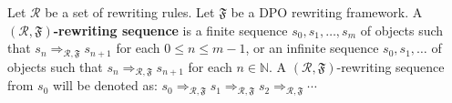 \begin{definition}
    Let \(\mathcal{R}\) be a set of rewriting rules. Let $\mathfrak{F}$ be a DPO rewriting framework.
    A \textbf{$(\mathcal{R},\mathfrak{F})$-rewriting sequence} is a finite sequence \(s_0,s_1,\hdots, s_m\) of objects such that \(s_n \Rightarrow_{\mathcal{R},\mathfrak{F}} s_{n+1}\) for each \( 0 \leq n \leq m-1\), or an infinite sequence \(s_0,s_1,\hdots\) of objects such that \(s_n \Rightarrow_{\mathcal{R},\mathfrak{F}} s_{n+1}\) for each \(n \in \mathbb{N}\).
    A $(\mathcal{R},\mathfrak{F})$-rewriting sequence from \( s_0 \) will be denoted as:
    \(
    s_0 \Rightarrow_{\mathcal{R},\mathfrak{F}} s_1 \Rightarrow_{\mathcal{R},\mathfrak{F}} s_2 \Rightarrow_{\mathcal{R},\mathfrak{F}} \cdots 
    \)
\end{definition}

